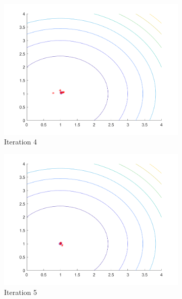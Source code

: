 \begin{figure}
\begin{subfigure}[b]{0.4\textwidth}
    \includegraphics[width=\textwidth]{img/pa/hunting_ex/hunt-iter-4}
    \caption{Iteration 4}
    \label{fig:hnt-iter-4}
  \end{subfigure}
  \begin{subfigure}[b]{0.4\textwidth}
    \includegraphics[width=\textwidth]{img/pa/hunting_ex/hunt-iter-5}
    \caption{Iteration 5}
    \label{fig:hnt-iter-5}
  \end{subfigure}
  \begin{subfigure}[b]{0.4\textwidth}

\end{subfigure}
\end{figure}
